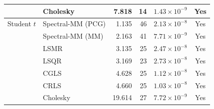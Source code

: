 \begin{table}[htbp]
\begin{tabular}{llrrrc}
 & Cholesky & 7.818 & 14 & $1.43\times10^{-9}$ & Yes \\
\midrule
Student $t$ & Spectral-MM (PCG) & 1.135 & 46 & $2.13\times10^{-8}$ & Yes \\
 & Spectral-MM (MM) & 2.163 & 41 & $7.71\times10^{-9}$ & Yes \\
 & LSMR & 3.135 & 25 & $2.47\times10^{-8}$ & Yes \\
 & LSQR & 3.169 & 23 & $2.73\times10^{-8}$ & Yes \\
 & CGLS & 4.628 & 25 & $1.12\times10^{-8}$ & Yes \\
 & CRLS & 4.660 & 25 & $1.03\times10^{-8}$ & Yes \\
 & Cholesky & 19.614 & 27 & $7.72\times10^{-9}$ & Yes \\
\bottomrule
\end{tabular}
\end{table}
